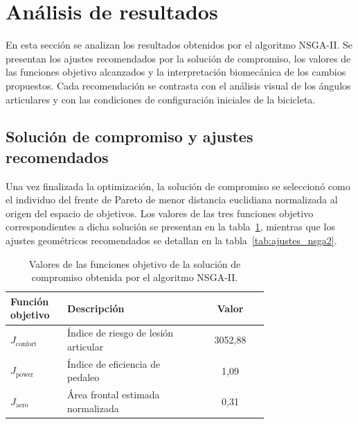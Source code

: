 \section{Análisis de resultados}
\label{sec:analisis_resultados}

En esta sección se analizan los resultados obtenidos por el algoritmo NSGA-II.
Se presentan los ajustes recomendados por la solución de compromiso, los
valores de las funciones objetivo alcanzados y la interpretación biomecánica
de los cambios propuestos. Cada recomendación se contrasta con el análisis
visual de los ángulos articulares y con las condiciones de configuración
iniciales de la bicicleta.

\subsection{Solución de compromiso y ajustes recomendados}
\label{ssec:solucion_compromiso}

Una vez finalizada la optimización, la solución de compromiso se seleccionó
como el individuo del frente de Pareto de menor distancia euclidiana
normalizada al origen del espacio de objetivos. Los valores de las tres
funciones objetivo correspondientes a dicha solución se presentan en la
tabla~\ref{tab:objetivos_nsga2}, mientras que los ajustes geométricos
recomendados se detallan en la tabla~\ref{tab:ajustes_nsga2}.

\begin{table}[H]
      \caption{Valores de las funciones objetivo de la solución de compromiso
            obtenida por el algoritmo NSGA-II.}
      \label{tab:objetivos_nsga2}
      \centering
      \small
      \begin{tabular}{p{0.22\linewidth}p{0.52\linewidth}c}
            \toprule
            \textbf{Función objetivo} & \textbf{Descripción} & \textbf{Valor} \\
            \midrule
            $J_{\text{confort}}$ & Índice de riesgo de lesión articular & 3052{,}88 \\
            $J_{\text{power}}$   & Índice de eficiencia de pedaleo  & 1{,}09 \\
            $J_{\text{aero}}$    & Área frontal estimada normalizada & 0{,}31 \\
            \bottomrule
      \end{tabular}
\end{table}


